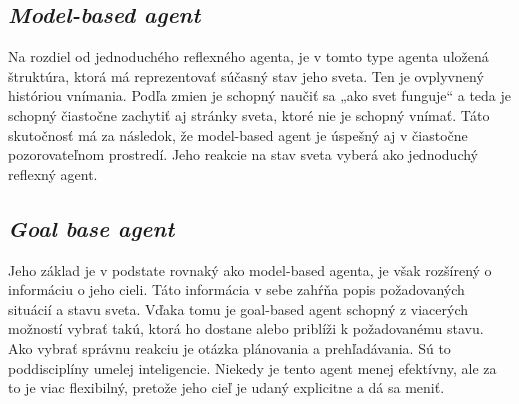 \documentclass[12pt,a4paper]{report}
\begin{document}
\subsection{\textit{Model-based agent}}
Na rozdiel od jednoduchého reflexného agenta, je v tomto type agenta uložená štruktúra, ktorá má reprezentovať súčasný stav jeho sveta. Ten je ovplyvnený históriou vnímania. Podľa zmien je schopný naučiť sa „ako svet funguje“ a teda je schopný čiastočne zachytiť aj stránky sveta, ktoré nie je schopný vnímať. Táto skutočnosť má za následok, že model-based agent je úspešný aj v čiastočne pozorovateľnom prostredí. Jeho reakcie na stav sveta vyberá ako jednoduchý reflexný agent.
\newline
\subsection{\textit{Goal base agent}}
Jeho základ je v podstate rovnaký ako model-based agenta, je však rozšírený o informáciu o jeho cieli. Táto informácia v sebe zahŕňa popis požadovaných situácií a stavu sveta. Vďaka tomu je goal-based agent schopný z viacerých možností vybrať takú, ktorá ho dostane alebo priblíži k požadovanému stavu. Ako vybrať správnu reakciu je otázka plánovania a prehľadávania. Sú to poddisciplíny umelej inteligencie. Niekedy je tento agent menej efektívny, ale za to je viac flexibilný, pretože jeho cieľ je udaný explicitne a dá sa meniť.
\newline
\end{document}
